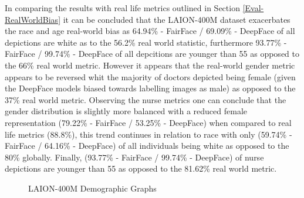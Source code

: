In comparing the results with real life metrics outlined in Section \ref{Eval-RealWorldBias} it can be concluded that the LAION-400M dataset exacerbates the race and age real-world bias as 64.94\% - FairFace / 69.09\% - DeepFace of all depictions are white as to the 56.2\% real world statistic, furthermore 93.77\% - FairFace / 99.74\% - DeepFace of all depcitions are younger than 55 as opposed to the 66\% real world metric. However it appears that the real-world gender metric appears to be reversed whit the majority of doctors depicted being female (given the DeepFace models biased towards labelling images as male) as opposed to the 37\% real world metric. Observing the nurse metrics one can conclude that the gender distribution is slightly more balanced with a reduced female representation (79.22\% - FairFace / 53.25\% - DeepFace) when compared to real life metrics (88.8\%), this trend continues in relation to race with only (59.74\% - FairFace / 64.16\%  - DeepFace) of all individuals being white as opposed to the 80\% globally. Finally, (93.77\% - FairFace / 99.74\% - DeepFace) of nurse depictions are younger than 55 as opposed to the 81.62\% real world metric. 

\begin{figure}[H]
\centering  
{}

\caption{LAION-400M Demographic Graphs}\label{fig:LAION-400M-Demographic-Graphs}
\end{figure}

